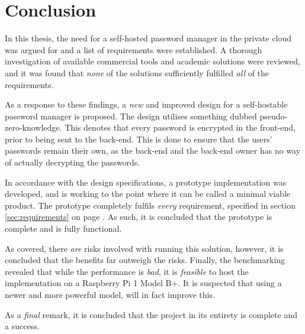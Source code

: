 \chapter{Conclusion}
	In this thesis, the need for a self-hosted password manager in the private cloud was argued for and a list of requirements were established. A thorough investigation of available commercial tools and academic solutions were reviewed, and it was found that \emph{none} of the solutions sufficiently fulfilled \emph{all} of the requirements.

	As a response to these findings, a \emph{new} and improved design for a self-hostable password manager is proposed. The design utilises something dubbed pseudo-zero-knowledge. This denotes that every password is encrypted in the front-end, prior to being sent to the back-end. This is done to ensure that the users' passwords remain their own, as the back-end and the back-end owner has no way of actually decrypting the passwords.

	In accordance with the design specifications, a prototype implementation was developed, and is working to the point where it can be called a minimal viable product. The prototype completely fulfils \emph{every} requirement, specified in section \ref{sec:requirements} on page \pageref{sec:requirements}. As such, it is concluded that the prototype is complete and is fully functional.

	As covered, there \emph{are} risks involved with running this solution, however, it is concluded that the benefits far outweigh the risks. Finally, the benchmarking revealed that while the performance is \emph{bad}, it is \emph{feasible} to host the implementation on a Raspberry Pi 1 Model B+. It is suspected that using a newer and more powerful model, will in fact improve this. 

	As a \emph{final} remark, it is concluded that the project in its entirety is complete and a success.
